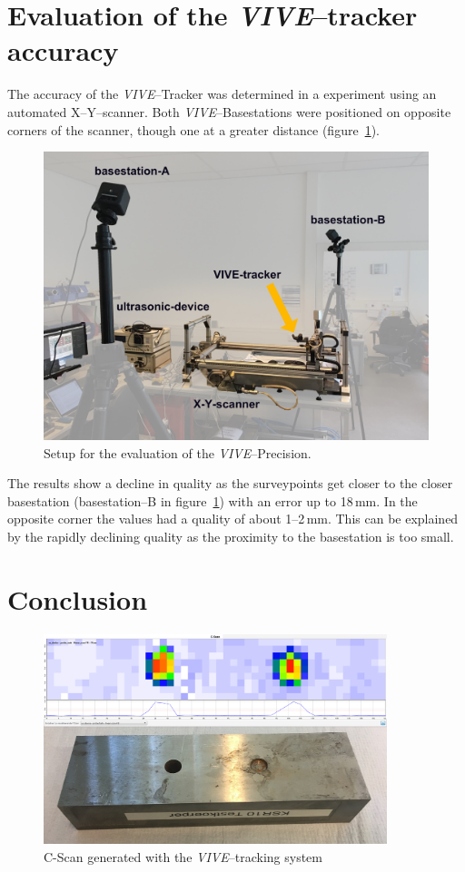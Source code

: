 \documentclass{VRARWorkshop}
\begin{document}
\section{Evaluation of the \textit{VIVE}--tracker accuracy}
The accuracy of the \textit{VIVE}--Tracker was determined in a experiment using an automated X--Y--scanner.
Both \textit{VIVE}--Basestations were positioned on opposite corners of the scanner, though one at a greater distance (figure~\ref{fig:precisionMeasurementSetup}).

\begin{figure}[h!]
    \begin{center}
        \includegraphics[width=120mm]{images/PrecisionMeasurement}
        \caption{\label{fig:precisionMeasurementSetup} Setup for the evaluation of the \textit{VIVE}--Precision.}
    \end{center}
\end{figure}

The results show a decline in quality as the surveypoints get closer to the closer basestation (basestation--B in figure~\ref{fig:precisionMeasurementSetup}) with an error up to 18\,mm.
In the opposite corner the values had a quality of about 1--2\,mm.
This can be explained by the rapidly declining quality as the proximity to the basestation is too small.

\section{Conclusion}

\begin{figure}[h!]
    \begin{center}
        \includegraphics[width=100mm]{images/CScanARUS}
        \caption{\label{fig:resultCScan} C-Scan generated with the \textit{VIVE}--tracking system}
    \end{center}
\end{figure}

\VRARsetbibstyle

\end{document}
